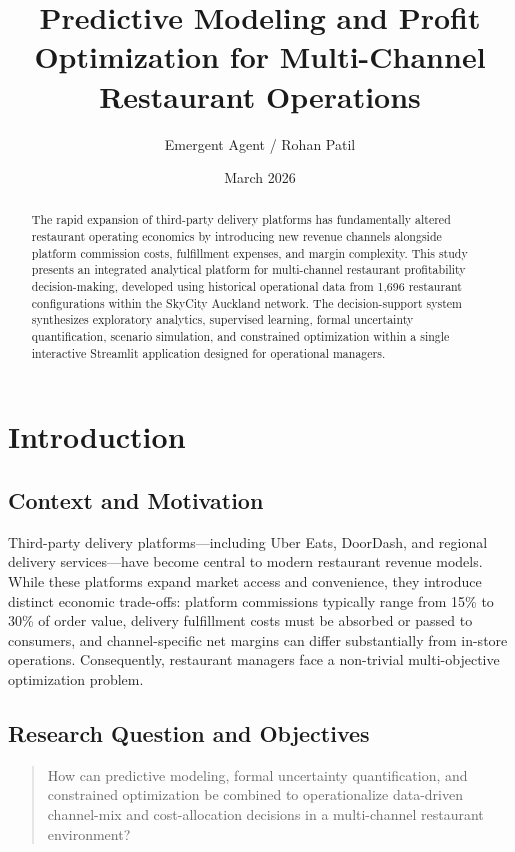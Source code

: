 \documentclass[11pt,a4paper]{article}
\title{Predictive Modeling and Profit Optimization for Multi-Channel Restaurant Operations}
\author{Emergent Agent / Rohan Patil}
\date{March 2026}
\begin{document}
\maketitle

\begin{abstract}
The rapid expansion of third-party delivery platforms has fundamentally altered restaurant operating economics by introducing new revenue channels alongside platform commission costs, fulfillment expenses, and margin complexity. This study presents an integrated analytical platform for multi-channel restaurant profitability decision-making, developed using historical operational data from 1,696 restaurant configurations within the SkyCity Auckland network. The decision-support system synthesizes exploratory analytics, supervised learning, formal uncertainty quantification, scenario simulation, and constrained optimization within a single interactive Streamlit application designed for operational managers.
\end{abstract}

\section{Introduction}
\subsection{Context and Motivation}
Third-party delivery platforms—including Uber Eats, DoorDash, and regional delivery services—have become central to modern restaurant revenue models. While these platforms expand market access and convenience, they introduce distinct economic trade-offs: platform commissions typically range from 15\% to 30\% of order value, delivery fulfillment costs must be absorbed or passed to consumers, and channel-specific net margins can differ substantially from in-store operations. Consequently, restaurant managers face a non-trivial multi-objective optimization problem.

\subsection{Research Question and Objectives}
\begin{quote}
How can predictive modeling, formal uncertainty quantification, and constrained optimization be combined to operationalize data-driven channel-mix and cost-allocation decisions in a multi-channel restaurant environment?
\end{quote}
\end{document}
